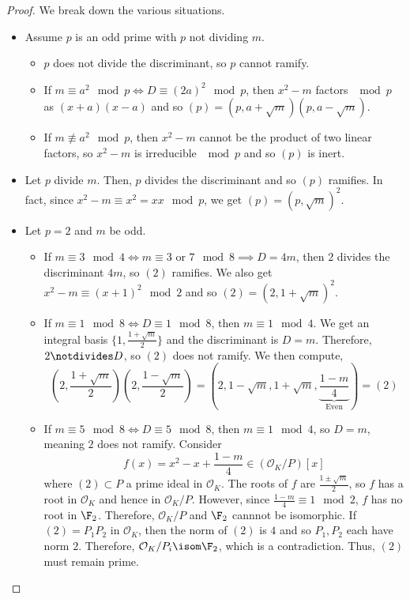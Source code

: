 \documentclass[11pt,leqno,oneside]{amsart}
\numberwithin{thm}{section}
\renewcommand{\O}{\mathcal{O}}
\begin{document}
\begin{proof}
  We break down the various situations.
  \begin{itemize}
  \item Assume \(p\) is an odd prime with \(p\) not dividing \(m\).
    \begin{itemize}
    \item \(p\) does not divide the discriminant, so \(p\) cannot
      ramify.
    \item If \(m \equiv a^2 \mod p \iff D \equiv (2a)^2 \mod p\), then
      \(x^2-m\) factors \(\mod 
      p\) as \((x+a)(x-a)\) and so \((p) =
      (p,a+\sqrt{m})(p,a-\sqrt{m})\).
    \item If \(m \not \equiv a^2 \mod p\), then \(x^2-m\) cannot be
      the product of two linear factors, so \(x^2-m\) is irreducible
      \(\mod p\) and so \((p)\) is inert.
    \end{itemize}
  \item Let \(p\) divide \(m\). Then, \(p\) divides the discriminant
    and so \((p)\) ramifies. In fact, since \(x^2-m \equiv x^2 = xx
    \mod p\), we get \((p) = (p,\sqrt{m})^2\).
  \item Let \(p = 2\) and \(m\) be odd.
    \begin{itemize}
    \item If \(m \equiv 3 \mod 4 \iff m \equiv 3 \text{ or } 7 \mod 8
      \implies D = 4m\), then \(2\) divides the 
      discriminant \(4m\), so \((2)\) ramifies. We also get \(x^2-m
      \equiv (x+1)^2 \mod 2\) and so \((2) = (2,1+\sqrt{m})^2\).
    \item If \(m \equiv 1 \mod 8 \iff D \equiv 1 \mod 8\), then \(m
      \equiv 1 \mod 4\). We get 
      an integral basis \(\{1, \frac{1+\sqrt{m}}{2}\}\) and the
      discriminant is \(D = m\). Therefore, \(2 \notdivides D\), so
      \((2)\) does not ramify. We then compute, \[
        (2,\frac{1+\sqrt{m}}{2})(2,\frac{1-\sqrt{m}}{2}) =
        (2,1-\sqrt{m},1+\sqrt{m},
        \underbrace{\frac{1-m}{4}}_{\text{Even}}) = (2)
      \]
    \item If \(m \equiv 5 \mod 8 \iff D \equiv 5 \mod 8\), then \(m
      \equiv 1 \mod 4\), so \(D 
      = m\), meaning \(2\) does not ramify. Consider \[
        f(x) = x^2-x+\frac{1-m}{4} \in (\O_K/P)[x]
      \]
      where \((2) \subset P\) a prime ideal in \(\O_K\). The roots of
      \(f\) are \(\frac{1\pm\sqrt{m}}{2}\), so \(f\) has a root in
      \(\O_K\) and hence in \(\O_K/P\). However, since \(\frac{1-m}{4}
      \equiv 1 \mod 2\), \(f\) has no root in \(\F_2\). Therefore,
      \(\O_K/P\) and \(\F_2\) cannnot be isomorphic. If \((2) =
      P_1P_2\) in \(\O_K\), then the norm of \((2)\) is \(4\) and so
      \(P_1,P_2\) each have norm \(2\). Therefore, \(\O_K/P_i \isom
      \F_2\), which is a contradiction. Thus, \((2)\) must remain prime.
    \end{itemize}
  \end{itemize}
\end{proof}
\end{document}
